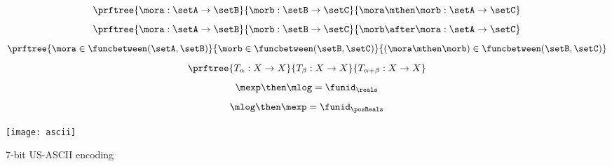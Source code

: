 \begin{forslides}
%

\begin{equation}\label{eq:funccomp1}
\prftree{\mora : \setA \to \setB}{\morb : \setB \to \setC}{\mora \mthen \morb : \setA \to \setC}
\end{equation}
\begin{equation}\label{eq:funccomp2}
\prftree{\mora : \setA \to \setB}{\morb : \setB \to \setC}{\morb \after \mora : \setA \to \setC}
\end{equation}
\begin{equation}\label{eq:funccomp3}
\prftree{\mora \in \funcbetween(\setA, \setB)}{%
\morb \in \funcbetween( \setB, \setC)}{ (\mora \mthen \morb) \in \funcbetween( \setB, \setC)}
\end{equation}
\begin{equation}\label{eq:transitions}
\prftree{T_\alpha:  X \to X }{T_\beta : X \to X}{T_{\alpha+\beta} : X \to X}
\end{equation}
\begin{equation}\label{eq:explogid}
\mexp \then \mlog = \funid_{\reals}
\end{equation}
\begin{equation}\label{eq:logexpid}
\mlog \then \mexp = \funid_{\posReals}
\end{equation}
\end{forslides}


\begin{marginfigure}
\texttt{[image: ascii]}
\caption{7-bit US-ASCII encoding }
\label{fig:ascii}
\end{marginfigure}

